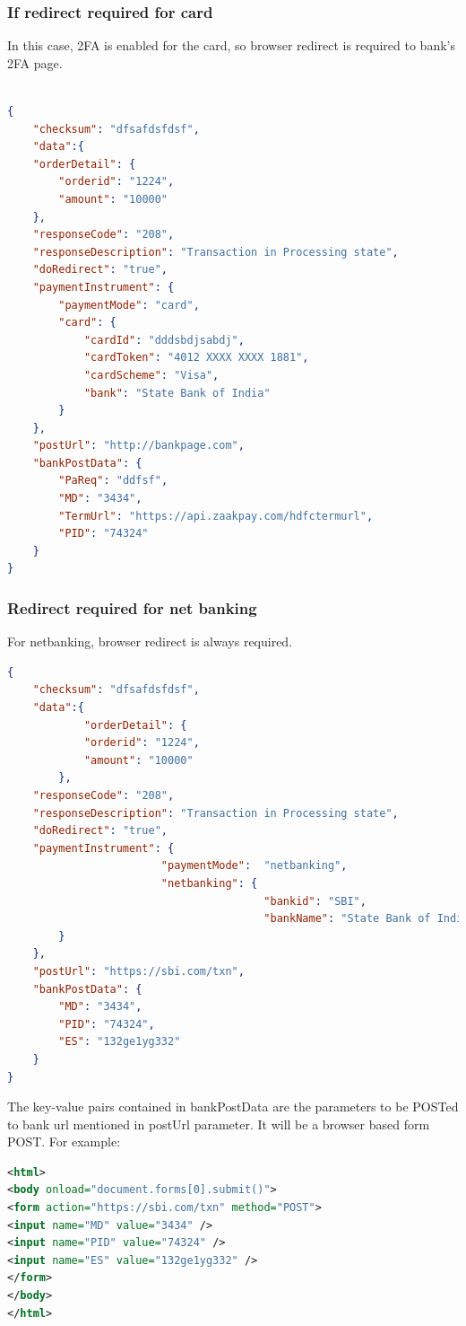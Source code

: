 \documentclass{article}
\begin{document}
\subsubsection{If redirect required for card}
In this case, 2FA is enabled for the card, so browser redirect is 
required to bank’s 2FA page. 
\begin{lstlisting}[language=json,breaklines=true]

{ 
    "checksum": "dfsafdsfdsf", 
    "data":{ 
    "orderDetail": { 
        "orderid": "1224", 
        "amount": "10000" 
    }, 
    "responseCode": "208", 
    "responseDescription": "Transaction in Processing state", 
    "doRedirect": "true", 
    "paymentInstrument": { 
        "paymentMode": "card", 
        "card": { 
            "cardId": "dddsbdjsabdj", 
            "cardToken": "4012 XXXX XXXX 1881", 
            "cardScheme": "Visa", 
            "bank": "State Bank of India" 
        } 
    }, 
    "postUrl": "http://bankpage.com", 
    "bankPostData": { 
        "PaReq": "ddfsf", 
        "MD": "3434", 
        "TermUrl": "https://api.zaakpay.com/hdfctermurl", 
        "PID": "74324" 
    } 
} 
\end{lstlisting}
\newpage
\subsubsection{Redirect required for net banking}
For netbanking, browser redirect is always required.  

\begin{lstlisting}[language=json,breaklines=true]
{ 
    "checksum": "dfsafdsfdsf", 
    "data":{ 
    		"orderDetail": { 
       	 	"orderid": "1224", 
        	"amount": "10000" 
    	}, 
    "responseCode": "208", 
    "responseDescription": "Transaction in Processing state", 
    "doRedirect": "true", 
    "paymentInstrument": { 
        				"paymentMode": 	"netbanking", 
        				"netbanking": {  
        								"bankid": "SBI", 
            							"bankName": "State Bank of India" 
        } 
    }, 
    "postUrl": "https://sbi.com/txn", 
    "bankPostData": { 
        "MD": "3434", 
        "PID": "74324", 
        "ES": "132ge1yg332" 
    } 
}  
\end{lstlisting}
The key-value pairs contained in bankPostData are the parameters to be POSTed to bank url mentioned in postUrl parameter.
It will be a browser based form POST. For example: 
\begin{lstlisting}[language=xml,breaklines=true]
<html> 
<body onload="document.forms[0].submit()"> 
<form action="https://sbi.com/txn" method="POST"> 
<input name="MD" value="3434" /> 
<input name="PID" value="74324" /> 
<input name="ES" value="132ge1yg332" /> 
</form> 
</body> 
</html> 
\end{lstlisting}
\end{document}
